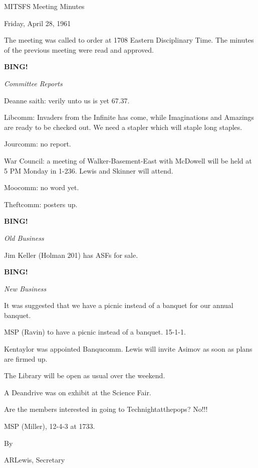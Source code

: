 \documentclass[12pt]{article}
\newcommand{\bing}{{\bf BING!} }
\newcommand{\goto}[1]{\bing \vskip 12pt \centerline{{\em{#1}}}}
\begin{document}
\begin{center}

MITSFS Meeting Minutes

Friday, April 28, 1961

\end{center}
 
\vspace{12pt}

\setlength{\parskip}{6pt}

\noindent
The meeting was called to order at 1708 Eastern Disciplinary Time. The minutes of the previous meeting were read and approved.

\goto{Committee Reports}

Deanne saith: verily unto us is yet 67.37.

Libcomm: Invaders from the Infinite has come, while Imaginations and Amazings are ready to be checked out. We need a stapler which will staple long staples.

Jourcomm: no report.

War Council: a meeting of Walker-Basement-East with McDowell will be held at 5 PM Monday in 1-236. Lewis and Skinner will attend.

Moocomm: no word yet.

Theftcomm: posters up.

\goto{Old Business}

Jim Keller (Holman 201) has ASFs for sale.

\goto{New Business}

It was suggested that we have a picnic instead of a banquet for our annual banquet.

MSP (Ravin) to have a picnic instead of a banquet. 15-1-1.

Kentaylor was appointed Banqucomm. Lewis will invite Asimov as soon as plans are firmed up.

The Library will be open as usual over the weekend.

A Deandrive was on exhibit at the Science Fair.

Are the members interested in going to Technightatthepops? No!!!

MSP (Miller), 12-4-3 at 1733.

\vspace{12pt}

\centerline{By}
\centerline{ARLewis, Secretary}
\end{document}

